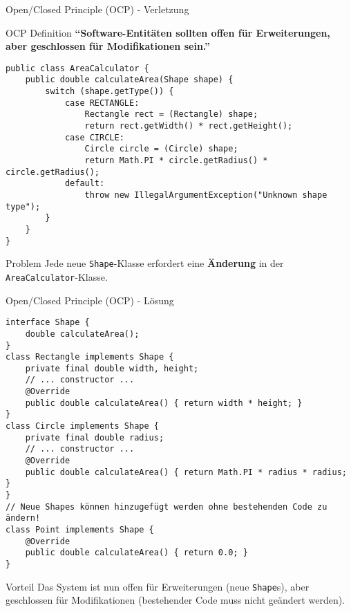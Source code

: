 \begin{frame}[fragile]{Open/Closed Principle (OCP) - Verletzung}
  \begin{exampleblock}{OCP Definition}
    \textbf{``Software-Entitäten sollten offen für Erweiterungen, aber geschlossen für Modifikationen sein.''}
  \end{exampleblock}
  \begin{lstlisting}[style=java, basicstyle=\tiny\ttfamily]
public class AreaCalculator {
    public double calculateArea(Shape shape) {
        switch (shape.getType()) {
            case RECTANGLE:
                Rectangle rect = (Rectangle) shape;
                return rect.getWidth() * rect.getHeight();
            case CIRCLE:
                Circle circle = (Circle) shape;
                return Math.PI * circle.getRadius() * circle.getRadius();
            default:
                throw new IllegalArgumentException("Unknown shape type");
        }
    }
}
  \end{lstlisting}
  \begin{alertblock}{Problem}
    Jede neue \texttt{Shape}-Klasse erfordert eine \textbf{Änderung} in der \texttt{AreaCalculator}-Klasse.
  \end{alertblock}
\end{frame}

\begin{frame}[fragile]{Open/Closed Principle (OCP) - Lösung}
  \begin{lstlisting}[style=java, basicstyle=\tiny\ttfamily]
interface Shape {
    double calculateArea();
}
class Rectangle implements Shape {
    private final double width, height;
    // ... constructor ...
    @Override
    public double calculateArea() { return width * height; }
}
class Circle implements Shape {
    private final double radius;
    // ... constructor ...
    @Override
    public double calculateArea() { return Math.PI * radius * radius; }
}
// Neue Shapes können hinzugefügt werden ohne bestehenden Code zu ändern!
class Point implements Shape {
    @Override
    public double calculateArea() { return 0.0; }
}
  \end{lstlisting}
  \begin{exampleblock}{Vorteil}
    Das System ist nun offen für Erweiterungen (neue \texttt{Shape}s), aber geschlossen für Modifikationen (bestehender Code muss nicht geändert werden).
  \end{exampleblock}
\end{frame}

